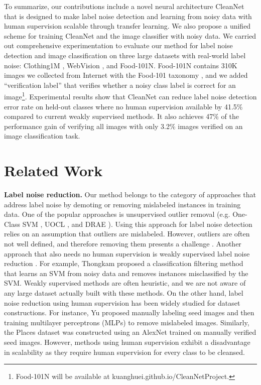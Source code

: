 \documentclass[10pt,twocolumn,letterpaper]{article}
\begin{document}
To summarize, our contributions include a novel neural architecture CleanNet that is designed to make label noise detection and learning from noisy data with human supervision scalable through transfer learning. We also propose a unified scheme for training CleanNet and the image classifier with noisy data. We carried out comprehensive experimentation to evaluate our method for label noise detection and image classification on three large datasets with real-world label noise: Clothing1M \cite{xiao2015learning}, WebVision \cite{li2017webvision}, and Food-101N. Food-101N contains 310K images we collected from Internet with the Food-101 taxonomy \cite{bossard2014food}, and we added ``verification label'' that verifies whether a noisy class label is correct for an image\footnote{Food-101N will be available at kuanghuei.github.io/CleanNetProject.}. Experimental results show that CleanNet can reduce label noise detection error rate on held-out classes where no human supervision available by 41.5\% compared to current weakly supervised methods. It also achieves 47\% of the performance gain of verifying all images with only 3.2\% images verified on an image classification task.


\section{Related Work}
\noindent
\textbf{Label noise reduction.} Our method belongs to the category of approaches that address label noise by demoting or removing mislabeled instances in training data. One of the popular approaches is unsupervised outlier removal (e.g. One-Class SVM \cite{scholkopf2001estimating}, UOCL \cite{liu2014unsupervised}, and DRAE \cite{xia2015learning}). Using this approach for label noise detection relies on an assumption that outliers are mislabeled. However, outliers are often not well defined, and therefore removing them presents a challenge \cite{frenay2014classification}. Another approach that also needs no human supervision is weakly supervised label noise reduction \cite{frenay2014classification}. For example, Thongkam \etal \cite{thongkam2008support} proposed a classification filtering method that learns an SVM from noisy data and removes instances misclassified by the SVM. Weakly supervised methods are often heuristic, and we are not aware of any large dataset actually built with these methods. On the other hand, label noise reduction using human supervision has been widely studied for dataset constructions. For instance, Yu \etal \cite{yu2015lsun} proposed manually labeling seed images and then training multilayer perceptrons (MLPs) to remove mislabeled images. Similarly, the Places dataset \cite{zhou2017places} was constructed using an AlexNet \cite{krizhevsky2012imagenet} trained on manually verified seed images. However, methods using human supervision exhibit a disadvantage in scalability as they require human supervision for every class to be cleansed. 
\end{document}
